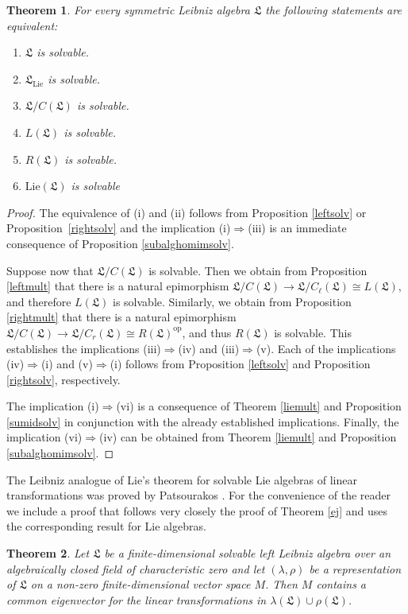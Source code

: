 \documentclass{amsart}
\newtheorem{thm}{Theorem}[section]
\numberwithin{equation}{section}
\newcommand{\op}{\mathrm{op}}
\newcommand{\lie}{\mathrm{Lie}}
\newcommand{\lf}{\mathfrak{L}}
\begin{document}
\newpage

\begin{thm}\label{solv}
For every symmetric Leibniz algebra $\lf$ the following statements are equivalent:
\begin{enumerate}
\item[(i)]   $\lf$ is solvable.
\item[(ii)]  $\lf_\lie$ is solvable.
\item[(iii)]  $\lf/C(\lf)$ is solvable.
\item[(iv)] $L(\lf)$ is solvable.
\item[(v)] $R(\lf)$ is solvable.
\item[(vi)] $\lie(\lf)$ is solvable
\end{enumerate}
\end{thm}

\begin{proof}
The equivalence of (i) and (ii) follows from Proposition \ref{leftsolv} or Proposition~\ref{rightsolv}
and the implication (i)$\Rightarrow$(iii) is an immediate consequence of Proposition \ref{subalghomimsolv}.

Suppose now that $\lf/C(\lf)$ is solvable. Then we obtain from Proposition \ref{leftmult} that there
is a natural epimorphism $\lf/C(\lf)\to\lf/C_\ell(\lf)\cong L(\lf)$, and therefore $L(\lf)$ is solvable.
Similarly, we obtain from Proposition \ref{rightmult} that there is a natural epimorphism $\lf/C(\lf)
\to\lf/C_r(\lf)\cong R(\lf)^\op$, and thus $R(\lf)$ is solvable. This establishes the implications
(iii)$\Rightarrow$(iv) and (iii)$\Rightarrow$(v). Each of the implications (iv)$\Rightarrow$(i)
and (v)$\Rightarrow$(i) follows from Proposition \ref{leftsolv} and Proposition \ref{rightsolv},
respectively.

The implication (i)$\Rightarrow$(vi) is a consequence of Theorem \ref{liemult} and Proposition
\ref{sumidsolv} in conjunction with the already established implications. Finally, the implication
(vi)$\Rightarrow$(iv) can be obtained from Theorem \ref{liemult} and Proposition \ref{subalghomimsolv}.
\end{proof}

The Leibniz analogue of Lie's theorem for solvable Lie algebras of linear transformations was
proved by Patsourakos \cite[Theorem 2]{P2}. For the convenience of the reader we include
a proof that follows very closely the proof of Theorem \ref{ej} and uses the corresponding
result for Lie algebras.

\begin{thm}\label{lie}
Let $\lf$ be a finite-dimensional solvable left Leibniz algebra over an algebraically closed field
of characteristic zero and let $(\lambda,\rho)$ be a representation of $\lf$ on a non-zero
finite-dimensional vector space $M$. Then $M$ contains a common eigenvector for the linear
transformations in $\lambda(\lf)\cup\rho(\lf)$.
\end{thm}
\end{document}
